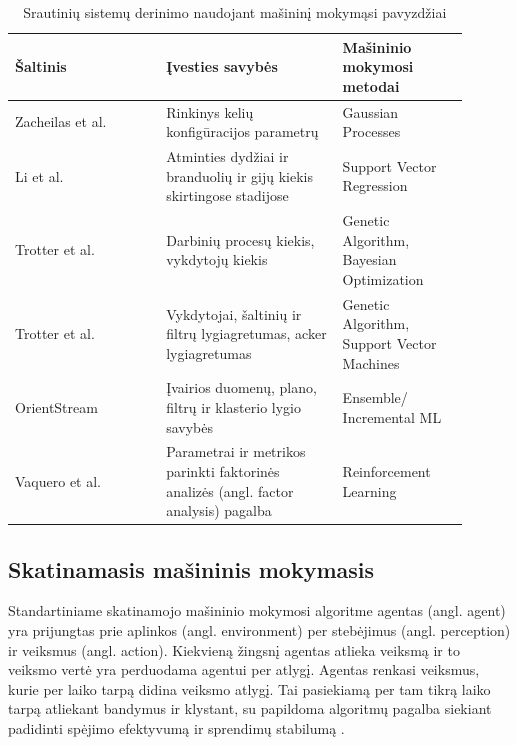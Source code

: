 \documentclass{VUMIFPSbakalaurinis}
\begin{document}
\begin{longtable}{|p{0.3\linewidth}|p{0.35\linewidth}|p{0.25\linewidth}|}
    \caption{Srautinių sistemų derinimo naudojant mašininį mokymąsi pavyzdžiai \cite{herodotou2020survey}}
    \label{ml–in–stream} \\
    \hline
    \rowcolor[HTML]{C0C0C0} 
    Šaltinis                                        & Įvesties savybės                                                                    & Mašininio mokymosi metodai                 \\ \hline
    Zacheilas et al. \cite{zacheilas2015elastic}    & Rinkinys kelių konfigūracijos parametrų                                             & Gaussian Processes                         \\ \hline
    Li et al. \cite{li2016performance}              & Atminties dydžiai ir branduolių ir gijų kiekis skirtingose stadijose                & Support Vector Regression                  \\ \hline
    Trotter et al. \cite{Trotter2017Into}           & Darbinių procesų kiekis, vykdytojų kiekis                                           & Genetic Algorithm, Bayesian Optimization   \\ \hline
    Trotter et al. \cite{trotter2019forecasting}    & Vykdytojai, šaltinių ir filtrų lygiagretumas, acker lygiagretumas                   & Genetic Algorithm, Support Vector Machines \\ \hline
    OrientStream \cite{wang2017automating}          & Įvairios duomenų, plano, filtrų ir klasterio lygio savybės                          & Ensemble/ Incremental ML                    \\ \hline
    Vaquero et al. \cite{vaquero2018autotuning}     & Parametrai ir metrikos parinkti faktorinės analizės (angl. factor analysis) pagalba & Reinforcement Learning                     \\ \hline
\end{longtable}

\subsection{Skatinamasis mašininis mokymasis}
Standartiniame skatinamojo mašininio mokymosi algoritme agentas (angl. agent) yra prijungtas prie aplinkos (angl. environment) per stebėjimus (angl. perception) ir veiksmus (angl. action). Kiekvieną žingsnį agentas atlieka veiksmą ir to veiksmo vertė yra perduodama agentui per atlygį. Agentas renkasi veiksmus, kurie per laiko tarpą didina veiksmo atlygį. Tai pasiekiamą per tam tikrą laiko tarpą atliekant bandymus ir klystant, su papildoma algoritmų pagalba siekiant padidinti spėjimo efektyvumą ir sprendimų stabilumą \cite{reinf}.     
\end{document}
